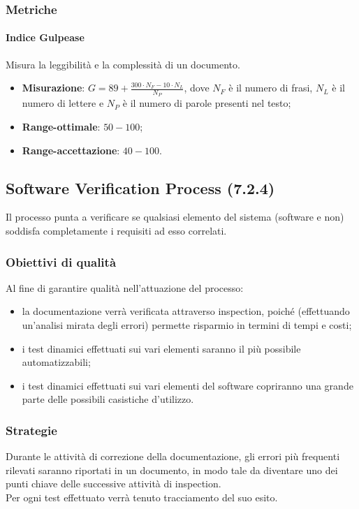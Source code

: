 \subsubsection{Metriche}
\paragraph{Indice Gulpease}
Misura la leggibilità e la complessità di un documento.
\begin{itemize}
\item \textbf{Misurazione}: $G = 89 + \frac{300\cdot{}N_{F}-10\cdot{}N_{L}}{N_{P}}$, dove $N_{F}$ è il numero di frasi, $N_{L}$ è il numero di lettere e $N_{P}$ è il numero di parole presenti nel testo;
\item \textbf{Range-ottimale}: $50 - 100$;
\item \textbf{Range-accettazione}: $40 - 100$.
\end{itemize}

\subsection{Software Verification Process (7.2.4)}
\label{soVerification}
Il processo punta a verificare se qualsiasi elemento del sistema (software e non) soddisfa completamente i requisiti ad esso correlati.
\subsubsection{Obiettivi di qualità}
Al fine di garantire qualità nell'attuazione del processo:
\begin{itemize}
\item la documentazione verrà verificata attraverso inspection, poiché (effettuando un'analisi mirata degli errori) permette risparmio in termini di tempi e costi;
\item i test dinamici effettuati sui vari elementi saranno il più possibile automatizzabili;
\item i test dinamici effettuati sui vari elementi del software copriranno una grande parte delle possibili casistiche d'utilizzo.
\end{itemize}
\subsubsection{Strategie}
Durante le attività di correzione della documentazione, gli errori più frequenti rilevati saranno riportati in un documento, in modo tale da diventare uno dei punti chiave delle successive attività di inspection.\\
Per ogni test effettuato verrà tenuto tracciamento del suo esito.
